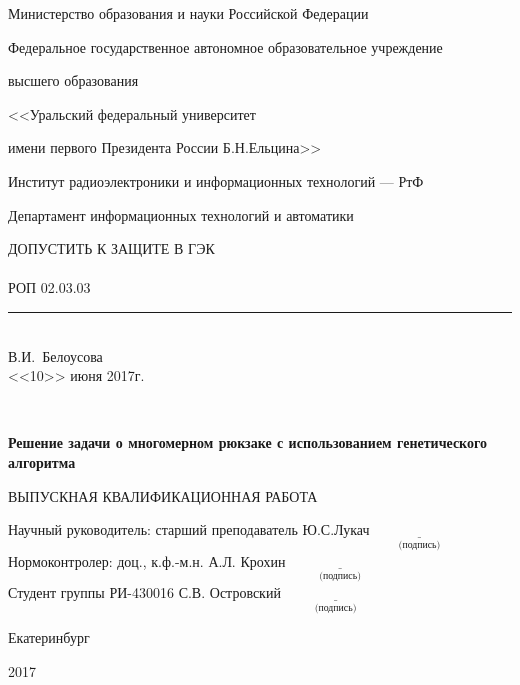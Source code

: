 \begin{titlepage}
{\small
\centerline{Министерство образования и науки Российской Федерации}
\centerline{Федеральное государственное автономное образовательное учреждение}
\centerline{высшего образования}
\centerline{\normalsize<<Уральский федеральный университет}
\centerline{\normalsize имени первого Президента России Б.Н.Ельцина>>}
\vskip0.2cm
\centerline{\normalsize Институт радиоэлектроники и информационных технологий --- РтФ}
\vskip0.2cm\centerline{\normalsize Департамент информационных технологий и автоматики}
}
\vskip1cm

\null\hfill
\begin{minipage}{0.6\textwidth}
\hfill ДОПУСТИТЬ К ЗАЩИТЕ В ГЭК \\ \\
РОП 02.03.03\rule[-1pt]{3.5cm}{0.4pt}
\\\phantom{XXXXXXXXXXXXXXXXXXX} В.И.~Белоусова
\\%
\hfill <<10>> июня  2017г.
\end{minipage}\\
\vskip2cm
\centerline{\bf Решение задачи о 
	многомерном рюкзаке с использованием генетического алгоритма}
\vskip0.2cm
\centerline{{ВЫПУСКНАЯ КВАЛИФИКАЦИОННАЯ РАБОТА}}

\vskip5.5cm
\noindent
Научный руководитель: старший преподаватель Ю.С.Лукач\hfill $\underset{\text{(подпись)}}{\underline{\hspace{3cm}}}$\\
\vskip0.2cm
Нормоконтролер: доц., к.ф.-м.н. А.Л. Крохин \hfill $\underset{\text{(подпись)}}{\underline{\hspace{3cm}}}$\\
\vskip0.2cm
Студент группы  РИ-430016 С.В. Островский  \hfill $\underset{\text{(подпись)}}{\underline{\hspace{3cm}}}$\\
\vfill
\centerline{Екатеринбург}
\centerline{2017}
\end{titlepage}